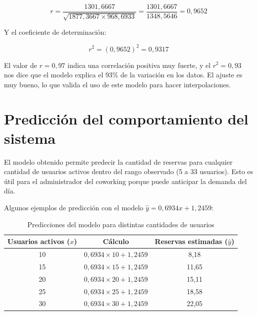 \documentclass[12pt,a4paper]{article}
\begin{document}
$$r = \frac{1301{,}6667}{\sqrt{1877{,}3667 \times 968{,}6933}} = \frac{1301{,}6667}{1348{,}5646} = 0{,}9652$$

\vspace{4pt}

Y el coeficiente de determinación:

$$r^2 = (0{,}9652)^2 = 0{,}9317$$

El valor de $r = 0{,}97$ indica una correlación positiva muy fuerte, y el $r^2 = 0{,}93$ nos dice que el modelo explica el 93\% de la variación en los datos. El ajuste es muy bueno, lo que valida el uso de este modelo para hacer interpolaciones.

\section{Predicción del comportamiento del sistema}

El modelo obtenido permite predecir la cantidad de reservas para cualquier cantidad de usuarios activos dentro del rango observado (5 a 33 usuarios). Esto es útil para el administrador del coworking porque puede anticipar la demanda del día.

Algunos ejemplos de predicción con el modelo $\hat{y} = 0{,}6934x + 1{,}2459$:

\vspace{6pt}
\begin{table}[H]
\centering
\caption{Predicciones del modelo para distintas cantidades de usuarios}
\vspace{4pt}
\begin{tabular}{ccc}
\toprule
\textbf{Usuarios activos ($x$)} & \textbf{Cálculo} & \textbf{Reservas estimadas ($\hat{y}$)} \\
\midrule
10 & $0{,}6934 \times 10 + 1{,}2459$ & 8,18 \\[4pt]
15 & $0{,}6934 \times 15 + 1{,}2459$ & 11,65 \\[4pt]
20 & $0{,}6934 \times 20 + 1{,}2459$ & 15,11 \\[4pt]
25 & $0{,}6934 \times 25 + 1{,}2459$ & 18,58 \\[4pt]
30 & $0{,}6934 \times 30 + 1{,}2459$ & 22,05 \\
\bottomrule
\end{tabular}
\end{table}
\vspace{4pt}
\end{document}
